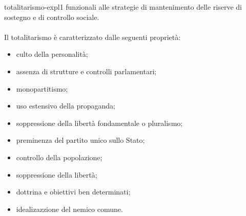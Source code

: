 \documentclass[preview]{standalone}
\begin{document}
\begin{snippet}{totalitarismo-expl1}
    funzionali alle strategie di mantenimento delle riserve di sostegno e di controllo sociale.
    \\\\
    Il totalitarismo è caratterizzato dalle seguenti proprietà:
    \begin{itemize}
        \item culto della personalità;
        \item assenza di strutture e controlli parlamentari;
        \item monopartitismo;
        \item uso estensivo della propaganda;
        \item soppressione della libertà fondamentale o pluralismo;
        \item preminenza del partito unico sullo Stato;
        \item controllo della popolazione;
        \item soppressione della libertà;
        \item dottrina e obiettivi ben determinati;
        \item idealizazzione del nemico comune.
    \end{itemize}
\end{snippet}
\end{document}
